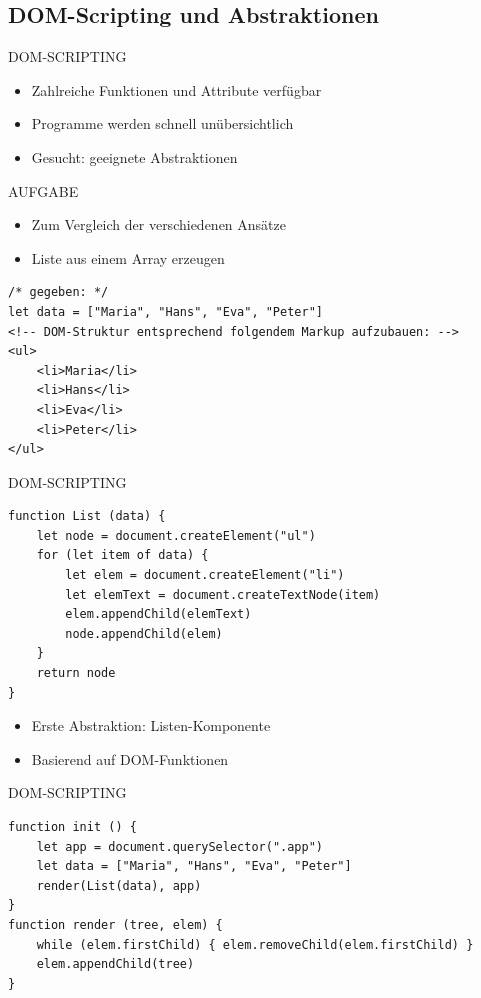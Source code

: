 \pagebreak

\subsection{DOM-Scripting und Abstraktionen}

\begin{definition}{DOM-SCRIPTING}
\begin{itemize}
  \item Zahlreiche Funktionen und Attribute verfügbar
  \item Programme werden schnell unübersichtlich
  \item Gesucht: geeignete Abstraktionen
\end{itemize}
\end{definition}

\begin{definition}{AUFGABE}
\begin{itemize}
  \item Zum Vergleich der verschiedenen Ansätze
  \item Liste aus einem Array erzeugen
\end{itemize}
\end{definition}

\begin{verbatim}
/* gegeben: */
let data = ["Maria", "Hans", "Eva", "Peter"]
<!-- DOM-Struktur entsprechend folgendem Markup aufzubauen: -->
<ul>
    <li>Maria</li>
    <li>Hans</li>
    <li>Eva</li>
    <li>Peter</li>
</ul>
\end{verbatim}

\begin{definition}{DOM-SCRIPTING}
\begin{verbatim}
function List (data) {
    let node = document.createElement("ul")
    for (let item of data) {
        let elem = document.createElement("li")
        let elemText = document.createTextNode(item)
        elem.appendChild(elemText)
        node.appendChild(elem)
    }
    return node
}
\end{verbatim}
\end{definition}

\begin{itemize}
  \item Erste Abstraktion: Listen-Komponente
  \item Basierend auf DOM-Funktionen
\end{itemize}

\begin{definition}{DOM-SCRIPTING}
\begin{verbatim}
function init () {
    let app = document.querySelector(".app")
    let data = ["Maria", "Hans", "Eva", "Peter"]
    render(List(data), app)
}
function render (tree, elem) {
    while (elem.firstChild) { elem.removeChild(elem.firstChild) }
    elem.appendChild(tree)
}
\end{verbatim}
\end{definition}

